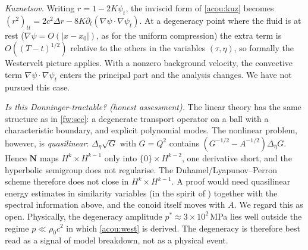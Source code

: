 \emph{Kuznetsov.} Writing $r=1-2K\psi_t$, the inviscid form of
\eqref{acou:kuz} becomes $(r^2)_{tt}=2c^2\Delta r-8K\partial_t(\nabla\psi\cdot\nabla\psi_t)$.
At a degeneracy point where the fluid is at rest ($\nabla\psi=O(|x-x_0|)$, as for the uniform compression) the extra term is
$O((T-t)^{1/2})$ relative to the others in the variables $(\tau,\eta)$, so formally the Westervelt picture applies. With a
nonzero background velocity, the convective term $\nabla\psi\cdot\nabla\psi_t$
enters the principal part and the analysis changes. We have not pursued
this case.

\emph{Is this Donninger-tractable? (honest assessment).} The linear theory
has the same structure as in \cref{fw:sec}: a degenerate transport operator
on a ball with a characteristic boundary, and explicit polynomial modes. The
nonlinear problem, however, is \emph{quasilinear}: $\Delta_\eta\sqrt{G}$ with
$G=Q^2$ contains $(G^{-1/2}-A^{-1/2})\Delta_\eta G$. Hence $\mathbf N$
maps $H^k\times H^{k-1}$ only into $\{0\}\times H^{k-2}$, one derivative
short, and the hyperbolic semigroup does not regularise. The
Duhamel/Lyapunov--Perron scheme therefore does not close in
$H^k\times H^{k-1}$. A proof would need quasilinear energy estimates in
similarity variables (in the spirit of \cite{Speck2020}) together with the
spectral information above, and the conoid itself moves with $A$. We regard
this as open. Physically, the degeneracy amplitude
$p^\ast\approx3\times10^2\,$MPa lies well outside the regime
$p\ll\rho_0c^2$ in which \eqref{acou:west} is derived. The degeneracy is
therefore best read as a signal of model breakdown, not as a physical event.

